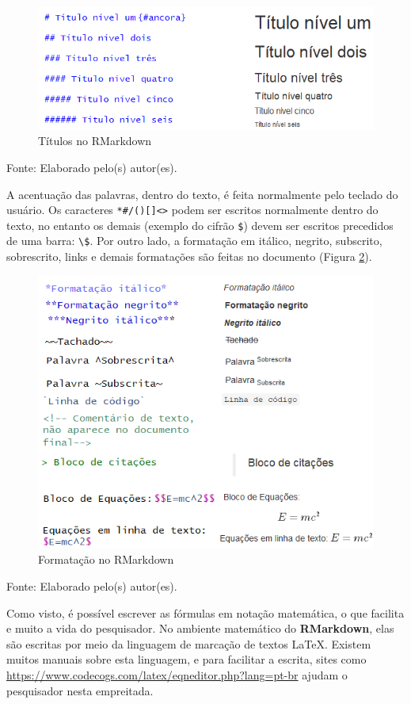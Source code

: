 \documentclass[12pt,brazil,oneside]{book}
\begin{document}
\begin{figure}[H]

{\centering \includegraphics[width=0.7\linewidth]{rmarktit} 

}

\caption{Títulos no RMarkdown}\label{fig:rmarktit}
\end{figure}

Fonte: Elaborado pelo(s) autor(es).

A acentuação das palavras, dentro do texto, é feita normalmente pelo teclado do usuário. Os caracteres \texttt{*\#/(){[}{]}\textless{}\textgreater{}} podem ser escritos normalmente dentro do texto, no entanto os demais (exemplo do cifrão \texttt{\$}) devem ser escritos precedidos de uma barra: \texttt{\textbackslash{}\$}. Por outro lado, a formatação em itálico, negrito, subscrito, sobrescrito, links e demais formatações são feitas no documento (Figura \ref{fig:rmarkform}).

\begin{figure}[H]

{\centering \includegraphics[width=0.7\linewidth]{rmarkform} 

}

\caption{Formatação no RMarkdown}\label{fig:rmarkform}
\end{figure}

Fonte: Elaborado pelo(s) autor(es).

Como visto, é possível escrever as fórmulas em notação matemática, o que facilita e muito a vida do pesquisador. No ambiente matemático do \textbf{RMarkdown}, elas são escritas por meio da linguagem de marcação de textos LaTeX. Existem muitos manuais sobre esta linguagem, e para facilitar a escrita, sites como \url{https://www.codecogs.com/latex/eqneditor.php?lang=pt-br} ajudam o pesquisador nesta empreitada.
\end{document}

